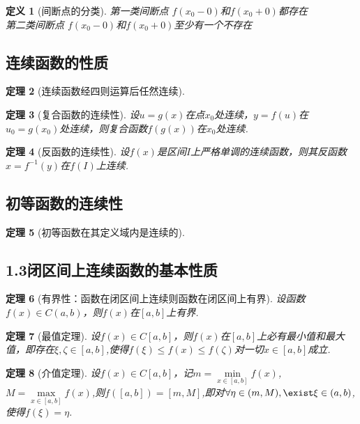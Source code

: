 \documentclass[12pt, a4paper, oneside]{ctexart}
\newtheorem{theorem}{定理}[section]
\newtheorem{definition}[theorem]{定义}
\begin{document}
\begin{definition}[间断点的分类]

第一类间断点
$f(x_0-0)$和$f(x_0+0)$都存在\\
第二类间断点
$f(x_0-0)$和$f(x_0+0)$至少有一个不存在
\end{definition}

\subsection{连续函数的性质}
\begin{theorem}[连续函数经四则运算后任然连续]
\end{theorem}

\begin{theorem}[复合函数的连续性]
设$u=g(x)$在点$x_0$处连续，$y=f(u)$在$u_0=g(x_0)$处连续，则复合函数$f(g(x))$在$x_0$处连续.
\end{theorem}

\begin{theorem}[反函数的连续性]
设$f(x)$是区间$I$上严格单调的连续函数，则其反函数$x=f^{-1}(y)$在$f(I)$上连续.
\end{theorem}

\subsection{初等函数的连续性}

\begin{theorem}[初等函数在其定义域内是连续的]
\end{theorem}

\subsection{1.3闭区间上连续函数的基本性质}

\begin{theorem}[有界性：函数在闭区间上连续则函数在闭区间上有界]
设函数$f(x)\in C(a,b)$，则$f(x)$在$[a,b]$上有界.
\end{theorem}

\begin{theorem}[最值定理]
设$f(x)\in C[a,b]$，则$f(x)$在$[a,b]$上必有最小值和最大值，即存在$\xi,\zeta \in [a,b]$,使得$f(\xi) \leq f(x)\leq f(\zeta)$对一切$x\in [a,b]$成立.
\end{theorem}

\begin{theorem}[介值定理]
设$f(x)\in C[a,b]$，记$m=\min\limits_{x\in [a,b]}f(x)$,$M=\max\limits_{x\in [a,b]}f(x)$,则$f([a,b])=[m,M]$,即对${\forall}\eta \in(m,M),\exist \xi \in (a,b)$,使得$f(\xi)=\eta$.
\end{theorem}
\end{document}
